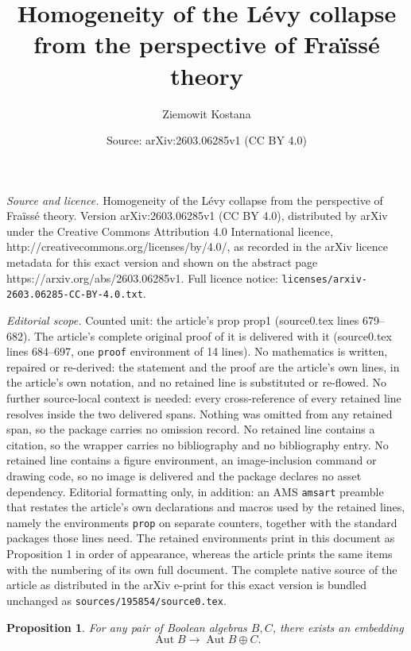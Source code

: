 \documentclass[10pt,a4paper]{amsart}
\title{Homogeneity of the L\'evy collapse from the perspective of Fra\"iss\'e theory}
\author{Ziemowit Kostana}
\date{Source: arXiv:2603.06285v1 (CC BY 4.0)}
\newtheorem{prop}{Proposition}
\newcommand{\aut}{\operatorname{Aut}}
\begin{document}
\maketitle

\noindent\emph{Source and licence.} Homogeneity of the L\'evy collapse from the perspective of Fra\"iss\'e theory. Version arXiv:2603.06285v1 (CC BY 4.0), distributed by arXiv under the Creative Commons Attribution 4.0 International licence, http://creativecommons.org/licenses/by/4.0/, as recorded in the arXiv licence metadata for this exact version and shown on the abstract page https://arxiv.org/abs/2603.06285v1. Full licence notice: \texttt{licenses/arxiv-2603.06285-CC-BY-4.0.txt}.\par\smallskip

\noindent\textit{Editorial scope.} Counted unit: the article's prop prop1 (source0.tex lines 679--682). The article's complete original proof of it is delivered with it (source0.tex lines 684--697, one \texttt{proof} environment of 14 lines). No mathematics is written, repaired or re-derived: the statement and the proof are the article's own lines, in the article's own notation, and no retained line is substituted or re-flowed.  No further source-local context is needed: every cross-reference of every retained line resolves inside the two delivered spans.  Nothing was omitted from any retained span, so the package carries no omission record.  No retained line contains a citation, so the wrapper carries no bibliography and no bibliography entry.  No retained line contains a figure environment, an image-inclusion command or drawing code, so no image is delivered and the package declares no asset dependency.  Editorial formatting only, in addition: an AMS \texttt{amsart} preamble that restates the article's own declarations and macros used by the retained lines, namely the environments \texttt{prop} on separate counters, together with the standard packages those lines need.  The retained environments print in this document as Proposition 1 in order of appearance, whereas the article prints the same items with the numbering of its own full document.  The complete native source of the article as distributed in the arXiv e-print for this exact version is bundled unchanged as \texttt{sources/195854/source0.tex}.
\begin{prop} \label{prop1}
	For any pair of Boolean algebras $B,C$, there exists an embedding
	$$\aut{B} \longrightarrow \aut{B \oplus C}.$$
\end{prop}
\end{document}
